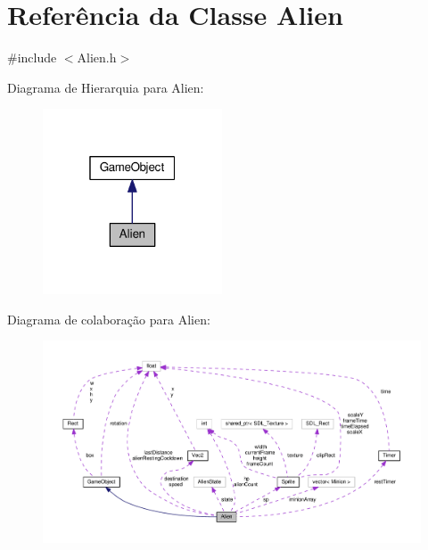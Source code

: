 \hypertarget{classAlien}{\section{Referência da Classe Alien}
\label{classAlien}
}


{\ttfamily \#include $<$Alien.\+h$>$}



Diagrama de Hierarquia para Alien\+:\nopagebreak
\begin{figure}[H]
\begin{center}
\leavevmode
\includegraphics[width=151pt]{classAlien__inherit__graph}
\end{center}
\end{figure}


Diagrama de colaboração para Alien\+:\nopagebreak
\begin{figure}[H]
\begin{center}
\leavevmode
\includegraphics[width=350pt]{classAlien__coll__graph}
\end{center}
\end{figure}
